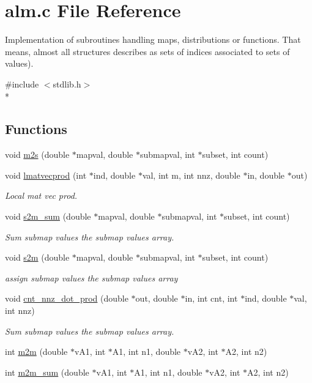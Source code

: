 \section{alm.\-c File Reference}
\label{alm_8c}


Implementation of subroutines handling maps, distributions or functions. That means, almost all structures describes as sets of indices associated to sets of values).  


{\ttfamily \#include $<$stdlib.\-h$>$}\\*
\subsection*{Functions}
\begin{DoxyCompactItemize}
\item 
void \hyperlink{alm_8c_a025f3e840ed5ec45c53aedc002feff2e}{m2s} (double $\ast$mapval, double $\ast$submapval, int $\ast$subset, int count)
\item 
void \hyperlink{alm_8c_a25f5f633a4483d645db5b72b1de6038e}{lmatvecprod} (int $\ast$ind, double $\ast$val, int m, int nnz, double $\ast$in, double $\ast$out)
\begin{DoxyCompactList}\small\item\em Local mat vec prod. \end{DoxyCompactList}\item 
void \hyperlink{alm_8c_a6e63772ec097a4b407a183ba90668771}{s2m\-\_\-sum} (double $\ast$mapval, double $\ast$submapval, int $\ast$subset, int count)
\begin{DoxyCompactList}\small\item\em Sum submap values the submap values array. \end{DoxyCompactList}\item 
void \hyperlink{alm_8c_a3215545f5ef51df80f796a4b727d6548}{s2m} (double $\ast$mapval, double $\ast$submapval, int $\ast$subset, int count)
\begin{DoxyCompactList}\small\item\em assign submap values the submap values array \end{DoxyCompactList}\item 
void \hyperlink{alm_8c_af2051489cb86480d4c9768b758db5313}{cnt\-\_\-nnz\-\_\-dot\-\_\-prod} (double $\ast$out, double $\ast$in, int cnt, int $\ast$ind, double $\ast$val, int nnz)
\begin{DoxyCompactList}\small\item\em Sum submap values the submap values array. \end{DoxyCompactList}\item 
int \hyperlink{alm_8c_a3097d396b49c10414a79152f4ebd2902}{m2m} (double $\ast$v\-A1, int $\ast$A1, int n1, double $\ast$v\-A2, int $\ast$A2, int n2)
\item 
int \hyperlink{alm_8c_a28c05d496e6168337d8a466affc1d0ac}{m2m\-\_\-sum} (double $\ast$v\-A1, int $\ast$A1, int n1, double $\ast$v\-A2, int $\ast$A2, int n2)
\end{DoxyCompactItemize}


